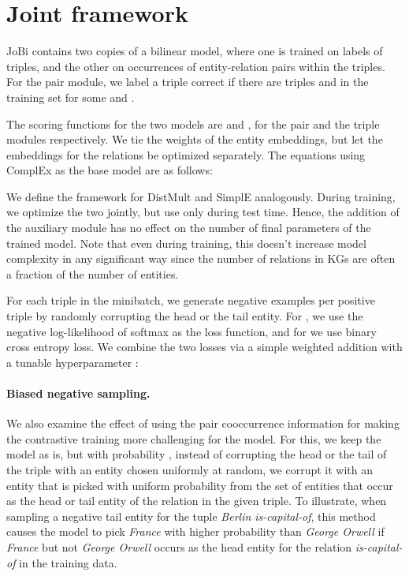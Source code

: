 \documentclass[11pt,a4paper, dvipsnames]{article}
\begin{document}
 
 \section{Joint framework} JoBi contains two copies of a bilinear model, where one is trained on labels of triples, and the other on occurrences of entity-relation pairs within the triples. For the pair module, we label a triple  correct if there are triples  and  in the training set for some  and . 
 
 The scoring functions for the two models are  and , for the pair and the triple modules respectively. We tie the weights of the entity embeddings, but let the embeddings for the relations be optimized separately. The equations using ComplEx as the base model are as follows:
 

We define the framework for DistMult and SimplE analogously. During training, we optimize the two jointly, but use only  during test time. Hence, the addition of the auxiliary module has no effect on the number of final parameters of the trained model. Note that even during training, this doesn't increase model complexity in any significant way since the number of relations in KGs are often a fraction of the number of entities. 
 
 For each triple in the minibatch, we generate  negative examples per positive triple by randomly corrupting the head or the tail entity. For , we use the negative log-likelihood of softmax as the loss function, and for  we use binary cross entropy loss. We combine the two losses via a simple weighted addition with a tunable hyperparameter :
 
 
 \paragraph{Biased negative sampling.} We also examine the effect of using the pair cooccurrence information for making the contrastive training more challenging for the model. For this, we keep the model as is, but with probability , instead of corrupting the head or the tail of the triple with an entity chosen uniformly at random, we corrupt it with an entity that is picked with uniform probability from the set of entities that occur as the head or tail entity of the relation in the given triple. To illustrate, when sampling a negative tail entity for the tuple \textit{Berlin is-capital-of}, this method causes the model to pick \textit{France} with higher probability than \textit{George Orwell} if \textit{France} but not \textit{George Orwell} occurs as the head entity for the relation \textit{is-capital-of} in the training data. 
\end{document}
